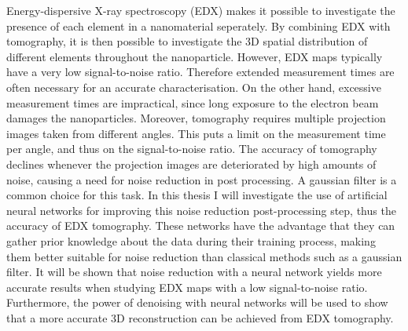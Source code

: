 \documentclass{report}
\begin{document}
Energy-dispersive X-ray spectroscopy (EDX) makes it possible to investigate the presence of each element in a nanomaterial seperately. By combining EDX with tomography, it is then possible to investigate the 3D spatial distribution of different elements throughout the nanoparticle. However, EDX maps typically have a very low signal-to-noise ratio. Therefore extended measurement times are often necessary for an accurate characterisation. On the other hand, excessive measurement times are impractical, since long exposure to the electron beam damages the nanoparticles. Moreover, tomography requires multiple projection images taken from different angles. This puts a limit on the measurement time per angle, and thus on the signal-to-noise ratio. The accuracy of tomography declines whenever the projection images are deteriorated by high amounts of noise, causing a need for noise reduction in post processing. A gaussian filter is a common choice for this task. In this thesis I will investigate the use of artificial neural networks for improving this noise reduction post-processing step, thus the accuracy of EDX tomography. These networks have the advantage that they can gather prior knowledge about the data during their training process, making them better suitable for noise reduction than classical methods such as a gaussian filter. It will be shown that noise reduction with a neural network yields more accurate results when studying EDX maps with a low signal-to-noise ratio. Furthermore, the power of denoising with neural networks will be used to show that a more accurate 3D reconstruction can be achieved from EDX tomography.
\end{document}
